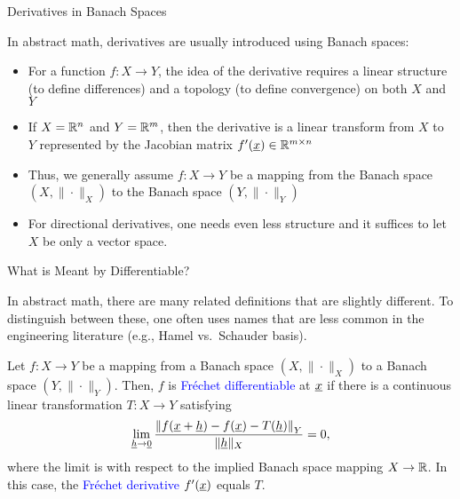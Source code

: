\documentclass[10pt,english,aspectratio=169]{beamer}
\begin{document}
\begin{frame}{Derivatives in Banach Spaces}

In abstract math, derivatives are usually introduced using Banach spaces: \vspace{1mm}
\begin{itemize}
\setlength\itemsep{3mm}
\item<1-> For a function $f \colon X \rightarrow Y$, the idea of the derivative requires a linear structure (to define differences) and a topology (to define convergence) on both $X$ and $Y$ \vspace{1mm}

\item<2-> If $X=\mathbb{R}^n$ and $Y=\mathbb{R}^m$, then the derivative is a linear transform from $X$ to $Y$ represented by the Jacobian matrix $f'(\underline{x}) \in \mathbb{R}^{m\times n}$ \vspace{1mm}

\item<3-> Thus, we generally assume $f \colon X \rightarrow Y$ be a mapping from the Banach space $(X,\|\cdot\|_X)$ to the Banach space $(Y,\|\cdot\|_Y)$ \vspace{1mm}

\item<4-> For directional derivatives, one needs even less structure and it suffices to let $X$ be only a vector space.

\end{itemize}
\end{frame}

\begin{frame}{What is Meant by Differentiable?}

In abstract math, there are many related definitions that are slightly different.
To distinguish between these, one often uses names that are less common in the engineering literature (e.g., Hamel vs.\ Schauder basis).

\vspace{3mm}

\begin{definition}[Differentiable]
Let $f \colon X \rightarrow Y$ be a mapping from a Banach space $(X,\|\cdot\|_X)$ to a Banach space $(Y,\|\cdot\|_Y)$.
Then, $f$ is \textcolor{blue}{Fr\'{e}chet differentiable} at $\underline{x}$ if there is a continuous linear transformation $T\colon X \to Y$ satisfying
\begin{equation*} \lim_{\underline{h} \to \underline{0}} \frac{\left\|f(\underline{x}+ \underline{h}) - f(\underline{x}) - T(\underline{h}) \right\|_Y}{\| \underline{h} \|_X} = 0,
\end{equation*}
where the limit is with respect to the implied Banach space mapping $X\to \mathbb{R}$.
In this case, the \textcolor{blue}{Fr\'{e}chet derivative} $f'(\underline{x})$ equals $T$.
\end{definition}
\end{frame}
\end{document}
